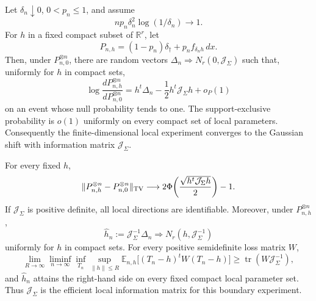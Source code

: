 \begin{theorem}
\label{thm:v19-vector-boundary-lan}
Let $\delta_n\downarrow0$, $0<p_n\le1$, and assume
\begin{equation}\label{eq:v19-vector-rate}
 n p_n\delta_n^2\log(1/\delta_n)\longrightarrow1.
\end{equation}
For $h$ in a fixed compact subset of $\mathbb R^r$, let
\[
 P_{n,h}=(1-p_n)\delta_\dagger+p_nf_{\delta_n h}\,dx.
\]
Then, under $P_{n,0}^{\otimes n}$, there are random vectors
$\Delta_n\Rightarrow N_r(0,\mathcal J_\Sigma)$ such that, uniformly for
$h$ in compact sets,
\begin{equation}\label{eq:v19-lan-expansion}
 \log\frac{dP_{n,h}^{\otimes n}}{dP_{n,0}^{\otimes n}}
 =h^t\Delta_n-\frac12h^t\mathcal J_\Sigma h+o_P(1)
\end{equation}
on an event whose null probability tends to one.  The support-exclusive
probability is $o(1)$ uniformly on every compact set of local parameters.
Consequently the finite-dimensional local experiment converges to the
Gaussian shift with information matrix $\mathcal J_\Sigma$.

For every fixed $h$,
\begin{equation}\label{eq:v19-vector-testing-profile}
 \|P_{n,h}^{\otimes n}-P_{n,0}^{\otimes n}\|_{\rm TV}
 \longrightarrow
 2\Phi\!\left(\frac{\sqrt{h^t\mathcal J_\Sigma h}}2\right)-1.
\end{equation}
If $\mathcal J_\Sigma$ is positive definite, all local directions are
identifiable.  Moreover, under $P_{n,h}^{\otimes n}$,
\begin{equation}\label{eq:v19-efficient-local-estimator}
 \widehat h_n:=\mathcal J_\Sigma^{-1}\Delta_n
 \Longrightarrow N_r(h,\mathcal J_\Sigma^{-1})
\end{equation}
uniformly for $h$ in compact sets.  For every positive semidefinite loss
matrix $W$,
\begin{equation}\label{eq:v19-local-minimax}
 \lim_{R\to\infty}\liminf_{n\to\infty}
 \inf_{T_n}\sup_{\|h\|\le R}
 \mathbb E_{n,h}
 \bigl[(T_n-h)^tW(T_n-h)\bigr]
 \ge \operatorname{tr}(W\mathcal J_\Sigma^{-1}),
\end{equation}
and $\widehat h_n$ attains the right-hand side on every fixed compact
local parameter set.  Thus $\mathcal J_\Sigma$ is the efficient local
information matrix for this boundary experiment.
\end{theorem}

